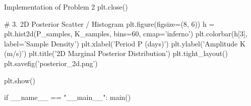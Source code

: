 \documentclass{article}
\begin{document}
\begin{pythonbox}{Implementation of Problem 2}
    plt.close()

    # 3. 2D Posterior Scatter / Histogram
    plt.figure(figsize=(8, 6))
    h = plt.hist2d(P_samples, K_samples, bins=60, cmap='inferno')
    plt.colorbar(h[3], label='Sample Density')
    plt.xlabel('Period P (days)')
    plt.ylabel('Amplitude K (m/s)')
    plt.title('2D Marginal Posterior Distribution')
    plt.tight_layout()
    plt.savefig('posterior_2d.png')
    
    plt.show()

if __name__ == "__main__":
    main()
\end{pythonbox}
\end{document}
